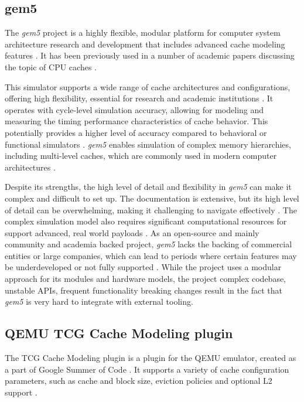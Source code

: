 \subsection{gem5}

The \textit{gem5} project is a highly flexible, modular platform for computer system architecture research and development that includes advanced cache modeling features \cite{gem5cachesupport}.
It has been previously used in a number of academic papers discussing the topic of CPU caches \cite{gem5cachecite1, gem5cachecite2, gem5cachecite3}.

This simulator supports a wide range of cache architectures and configurations, offering high flexibility, essential for research and academic institutions \cite{gem5}.
It operates with cycle-level simulation accuracy, allowing for modeling and measuring the timing performance characteristics of cache behavior. This potentially provides a higher level of accuracy
compared to behavioral or functional simulators \cite{gem5accuracy}. \textit{gem5} enables simulation of complex memory hierarchies, including multi-level caches, which are commonly
used in modern computer architectures \cite{gem5multilevel, cachesimsurv}.

Despite its strengths, the high level of detail and flexibility in \textit{gem5}
can make it complex and difficult to set up. The documentation is extensive, but its high level of detail can be overwhelming,
making it challenging to navigate effectively \cite{gem5hell}. The complex simulation model also requires significant computational resources for support advanced, real world payloads
\cite{gem5, cachesimsurv}. As an open-source and mainly community and academia backed project, \textit{gem5} lacks the backing of commercial entities or large companies, which can lead to
periods where certain features may be underdeveloped or not fully supported \cite{gem5hell, gem5maintainers}.
While the project uses a modular approach for its modules and hardware models, the project complex codebase,
unstable APIs, frequent functionality breaking changes \cite{gem5hell} result in the fact that \textit{gem5} is very hard to integrate with external tooling.

\subsection{QEMU TCG Cache Modeling plugin} \label{sec:qemu_cache}

The TCG Cache Modeling plugin is a plugin for the QEMU emulator, created as a part of Google Summer of Code \cite{qemucachegsoc}. It supports a variety of cache configuration parameters, such as
cache and block size, eviction policies and optional L2 support \cite{tcgcachemodelling}.

